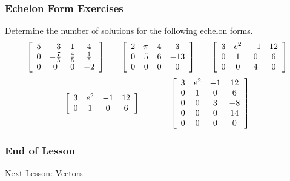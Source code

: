 \documentclass[xcolor=dvipsnames]{beamer}
\begin{document}
\begin{frame}
  \frametitle{Echelon Form Exercises}
  {\ubung} Determine the number of solutions for the following echelon
  forms.
  \begin{equation}
    \label{eq:uababohk}
    \left[
      \begin{array}{cccc}
        5 & -3 & 1 & 4 \\
        0 & -\frac{7}{5} & \frac{4}{5} & \frac{1}{5} \\
        0 & 0 & 0 & -2
      \end{array}\right]\hspace{.25in}\left[
      \begin{array}{cccc}
        2 & \pi & 4 & 3 \\
        0 & 5 & 6 & -13 \\
        0 & 0 & 0 & 0
      \end{array}\right]\hspace{.25in}\left[
      \begin{array}{cccc}
        3 & e^{2} & -1 & 12 \\
        0 & 1 & 0 & 6 \\
        0 & 0 & 4 & 0
      \end{array}\right]\notag
  \end{equation}
  \begin{equation}
    \label{eq:oataequa}
    \left[
      \begin{array}{cccc}
        3 & e^{2} & -1 & 12 \\
        0 & 1 & 0 & 6
      \end{array}\right]\hspace{.5in}\left[
      \begin{array}{cccc}
        3 & e^{2} & -1 & 12 \\
        0 & 1 & 0 & 6 \\
        0 & 0 & 3 & -8 \\
        0 & 0 & 0 & 14 \\
        0 & 0 & 0 & 0
      \end{array}\right]\notag
  \end{equation}
\end{frame}

\begin{frame}
  \frametitle{End of Lesson}
Next Lesson: Vectors
\end{frame}
\end{document}
